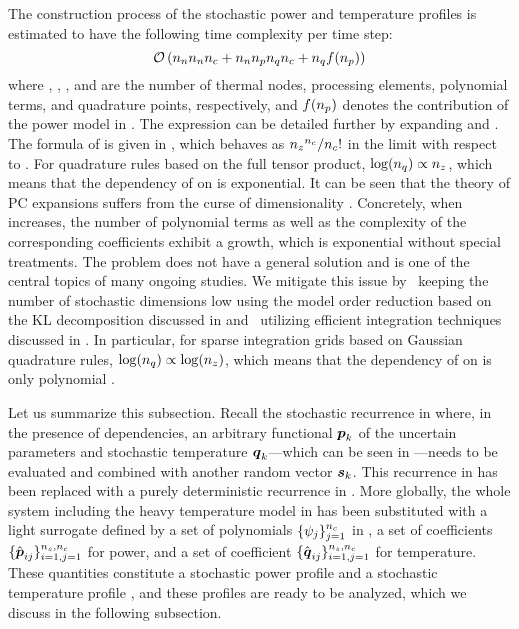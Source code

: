 The construction process of the stochastic power and temperature profiles is
estimated to have the following time complexity per time step:
\[
  \mathcal{O}\left({n_{n}} {n_{n}} {n_{c}} + {n_{n}} {n_{p}} {n_{q}} {n_{c}} + {n_{q}} f({n_{p}})\right)
\]
where \nn, \np, \nc, and \nq are the number of thermal nodes, processing
elements, polynomial terms, and quadrature points, respectively,
and $f({n_{p}})$ denotes the contribution of the power model in
. The expression can be detailed further by expanding
\nc and \nq. The formula of \nc is given in ,
which behaves as ${n_{z}}^{n_{c}} / {n_{c}}!$ in the limit with respect to \nz. For
quadrature rules based on the full tensor product, $\log({n_{q}}) \propto {n_{z}}$,
which means that the dependency of \nq on \nz is exponential. It can be seen
that the theory of \ac{PC} expansions suffers from the curse of dimensionality
\cite{eldred2008, xiu2010}. Concretely, when \nz increases, the number of
polynomial terms as well as the complexity of the corresponding coefficients
exhibit a growth, which is exponential without special treatments. The problem
does not have a general solution and is one of the central topics of many
ongoing studies. We mitigate this issue by \one~keeping the number of stochastic
dimensions low using the model order reduction based on the \ac{KL}
decomposition discussed in  and \two~utilizing
efficient integration techniques discussed in . In
particular, for sparse integration grids based on Gaussian quadrature rules,
$\log({n_{q}}) \propto \log({n_{z}})$, which means that the dependency of \nq on \nz is
only polynomial \cite{heiss2008}.

Let us summarize this subsection. Recall the stochastic recurrence in
 where, in the presence of dependencies, an
arbitrary functional $\boldsymbol{p}_k$ of the uncertain parameters \vu and stochastic
temperature $\boldsymbol{q}_k$---which can be seen in ---needs to
be evaluated and combined with another random vector $\boldsymbol{s}_k$. This recurrence in
 has been replaced with a purely deterministic
recurrence in . More globally, the whole system
including the heavy temperature model in  has
been substituted with a light surrogate defined by a set of polynomials $\{
\psi_j \}_{j = 1}^{n_{c}}$ in \vz, a set of coefficients $\{ \hat{\boldsymbol{p}}_{ij} \}_{i =
1, j = 1}^{{n_{s}}, {n_{c}}}$ for power, and a set of coefficient $\{ \hat{\boldsymbol{q}}_{ij}
\}_{i = 1, j = 1}^{{n_{s}}, {n_{c}}}$ for temperature. These quantities constitute a
stochastic power profile \mp and a stochastic temperature profile \mq, and these
profiles are ready to be analyzed, which we discuss in the following subsection.


